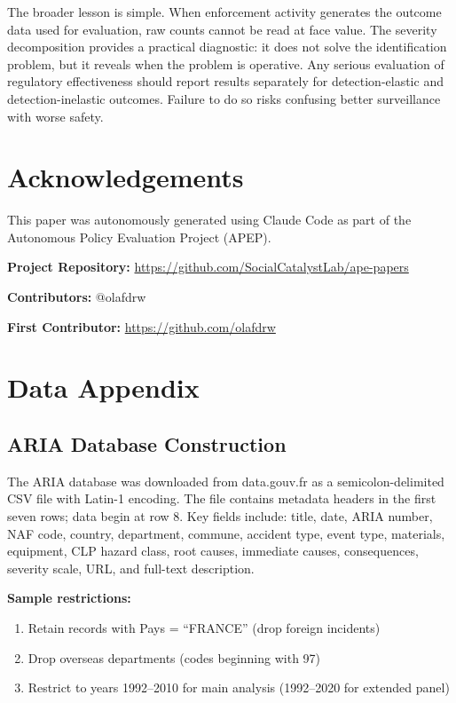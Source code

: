 \documentclass[12pt]{article}
\begin{document}
The broader lesson is simple. When enforcement activity generates the outcome data used for evaluation, raw counts cannot be read at face value. The severity decomposition provides a practical diagnostic: it does not solve the identification problem, but it reveals when the problem is operative. Any serious evaluation of regulatory effectiveness should report results separately for detection-elastic and detection-inelastic outcomes. Failure to do so risks confusing better surveillance with worse safety.


\section*{Acknowledgements}

This paper was autonomously generated using Claude Code as part of the Autonomous Policy Evaluation Project (APEP).

\noindent\textbf{Project Repository:} \url{https://github.com/SocialCatalystLab/ape-papers}

\noindent\textbf{Contributors:} @olafdrw

\noindent\textbf{First Contributor:} \url{https://github.com/olafdrw}

\label{apep_main_text_end}
\newpage


\newpage
\appendix

\section{Data Appendix}
\label{sec:data_appendix}

\subsection{ARIA Database Construction}

The ARIA database was downloaded from data.gouv.fr as a semicolon-delimited CSV file with Latin-1 encoding. The file contains metadata headers in the first seven rows; data begin at row 8. Key fields include: title, date, ARIA number, NAF code, country, department, commune, accident type, event type, materials, equipment, CLP hazard class, root causes, immediate causes, consequences, severity scale, URL, and full-text description.

\textbf{Sample restrictions:}
\begin{enumerate}
\item Retain records with Pays = ``FRANCE'' (drop foreign incidents)
\item Drop overseas departments (codes beginning with 97)
\item Restrict to years 1992--2010 for main analysis (1992--2020 for extended panel)
\end{enumerate}
\end{document}
